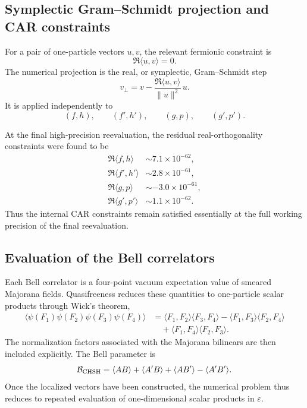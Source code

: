 \documentclass[11pt]{article}
\begin{document}
\subsection{Symplectic Gram--Schmidt projection and CAR constraints}

For a pair of one-particle vectors $u,v$, the relevant fermionic constraint is
\begin{equation}
\Re\langle u,v\rangle=0 .
\label{eq:app-car}
\end{equation}
The numerical projection is the real, or symplectic, Gram--Schmidt step
\begin{equation}
v_\perp
=
v-
\frac{\Re\langle u,v\rangle}{\|u\|^2}\,u .
\label{eq:app-gs}
\end{equation}
It is applied independently to
\begin{equation}
(f,h),\qquad
(f',h'),\qquad
(g,p),\qquad
(g',p').
\label{eq:app-pairs}
\end{equation}

At the final high-precision reevaluation, the residual real-orthogonality
constraints were found to be
\begin{align}
\Re\langle f,h\rangle
&\sim 7.1\times10^{-62},
\\
\Re\langle f',h'\rangle
&\sim 2.8\times10^{-61},
\\
\Re\langle g,p\rangle
&\sim -3.0\times10^{-61},
\\
\Re\langle g',p'\rangle
&\sim 1.1\times10^{-62}.
\label{eq:app-residuals}
\end{align}
Thus the internal CAR constraints remain satisfied essentially at the full
working precision of the final reevaluation.

\subsection{Evaluation of the Bell correlators}

Each Bell correlator is a four-point vacuum expectation value of smeared
Majorana fields. Quasifreeness reduces these quantities to one-particle scalar
products through Wick's theorem,
\begin{align}
\langle
\psi(F_1)\psi(F_2)\psi(F_3)\psi(F_4)
\rangle
&=
\langle F_1,F_2\rangle\langle F_3,F_4\rangle
-
\langle F_1,F_3\rangle\langle F_2,F_4\rangle
\nonumber\\
&\quad+
\langle F_1,F_4\rangle\langle F_2,F_3\rangle .
\label{eq:app-wick}
\end{align}
The normalization factors associated with the Majorana bilinears are then
included explicitly. The Bell parameter is
\begin{equation}
\mathcal B_{\rm CHSH}
=
\langle AB\rangle
+
\langle A'B\rangle
+
\langle AB'\rangle
-
\langle A'B'\rangle .
\label{eq:app-bchsh}
\end{equation}
Once the localized vectors have been constructed, the numerical problem thus
reduces to repeated evaluation of one-dimensional scalar products in
$\varepsilon$.
\end{document}
